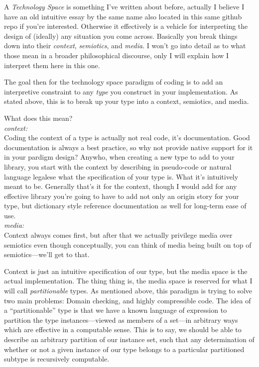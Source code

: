 \documentclass[twoside]{article}
\begin{document}
A \emph{Technology Space} is something I've written about before, actually I believe I have an old intuitive essay by the
same name also located in this same github repo if you're interested. Otherwise it effectively is a vehicle for interpreting
the design of (ideally) any situation you come across. Basically you break things down into their \emph{context},
\emph{semiotics}, and \emph{media}. I won't go into detail as to what those mean in a broader philosophical discourse,
only I will explain how I interpret them here in this one.

The goal then for the technology space paradigm of coding is to add an interpretive constraint to any \emph{type} you
construct in your implementation. As stated above, this is to break up your type into a context, semiotics, and media.

What does this mean?\\[0.1cm]

\emph{context:}\\[0.1cm]

Coding the context of a type is actually not real code, it's documentation. Good documentation is always a best practice,
so why not provide native support for it in your pardigm design? Anywho, when creating a new type to add to your library,
you start with the context by describing in pseudo-code or natural language legalese what the specification of your type
is. What it's intuitively meant to be. Generally that's it for the context, though I would add for any effective library
you're going to have to add not only an origin story for your type, but dictionary style reference documentation as well
for long-term ease of use.\\[0.1cm]

\emph{media:}\\[0.1cm]

Context always comes first, but after that we actually privilege media over semiotics even though conceptually,
you can think of media being built on top of semiotics---we'll get to that.

Context is just an intuitive specification of our type, but the media space is the actual implementation. The thing thing is,
the media space is reserved for what I will call \emph{partitionable} types. As mentioned above, this paradigm is trying to solve
two main problems: Domain checking, and highly compressible code. The idea of a ``partitionable'' type is that we have
a known language of expression to partition the type instances---viewed as members of a set---in arbitrary ways which are effective
in a computable sense. This is to say, we should be able to describe an arbitrary partition of our instance set, such that
any determination of whether or not a given instance of our type belongs to a particular partitioned subtype is recursively computable.
\end{document}
